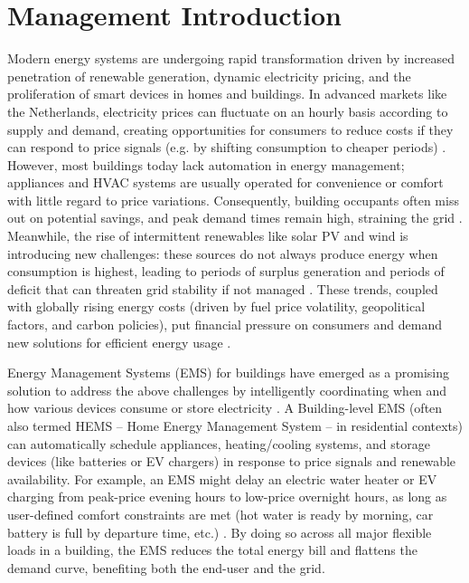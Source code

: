 \documentclass[12pt,a4paper]{article}
\begin{document}
\clearpage

\section{Management Introduction}
Modern energy systems are undergoing rapid transformation driven by increased penetration of renewable generation, dynamic electricity pricing, and the proliferation of smart devices in homes and buildings. In advanced markets like the Netherlands, electricity prices can fluctuate on an hourly basis according to supply and demand, creating opportunities for consumers to reduce costs if they can respond to price signals (e.g. by shifting consumption to cheaper periods) \cite{Mahmoudi2020, AlSorour2022}. However, most buildings today lack automation in energy management; appliances and HVAC systems are usually operated for convenience or comfort with little regard to price variations. Consequently, building occupants often miss out on potential savings, and peak demand times remain high, straining the grid \cite{Koltsaklis2019, Chen2024}. Meanwhile, the rise of intermittent renewables like solar PV and wind is introducing new challenges: these sources do not always produce energy when consumption is highest, leading to periods of surplus generation and periods of deficit that can threaten grid stability if not managed \cite{Yoshida2018, TostadoVeliz2023}. These trends, coupled with globally rising energy costs (driven by fuel price volatility, geopolitical factors, and carbon policies), put financial pressure on consumers and demand new solutions for efficient energy usage \cite{Rehman2025, Chen2024}.

Energy Management Systems (EMS) for buildings have emerged as a promising solution to address the above challenges by intelligently coordinating when and how various devices consume or store electricity \cite{AlSorour2022, Mahmoudi2020}. A Building-level EMS (often also termed HEMS – Home Energy Management System – in residential contexts) can automatically schedule appliances, heating/cooling systems, and storage devices (like batteries or EV chargers) in response to price signals and renewable availability. For example, an EMS might delay an electric water heater or EV charging from peak-price evening hours to low-price overnight hours, as long as user-defined comfort constraints are met (hot water is ready by morning, car battery is full by departure time, etc.) \cite{Yoshida2018, TostadoVeliz2023}. By doing so across all major flexible loads in a building, the EMS reduces the total energy bill and flattens the demand curve, benefiting both the end-user and the grid.
\end{document}
